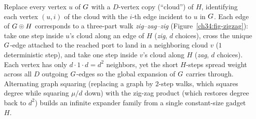 \begin{intuitionbox}
Replace every vertex $u$ of $G$ with a $D$-vertex copy (``cloud'') of $H$, identifying each vertex $(u,i)$ of the cloud with the $i$-th edge incident to $u$ in $G$. Each edge of $G\mathbin{\circledcirc} H$ corresponds to a three-part walk \emph{zig--zag--zig} (Figure~\ref{ch34:fig-zigzag}): take one step inside $u$'s cloud along an edge of $H$ (\emph{zig}, $d$ choices), cross the unique $G$-edge attached to the reached port to land in a neighboring cloud $v$ ($1$ deterministic step), and take one step inside $v$'s cloud along $H$ (\emph{zag}, $d$ choices). Each vertex has only $d\cdot 1\cdot d = d^2$ neighbors, yet the short $H$-steps spread weight across all $D$ outgoing $G$-edges so the global expansion of $G$ carries through. Alternating graph squaring (replacing a graph by $2$-step walks, which squares degree while squaring $\mu/d$ down) with the zig-zag product (which restores degree back to $d^2$) builds an infinite expander family from a single constant-size gadget $H$.
\end{intuitionbox}

